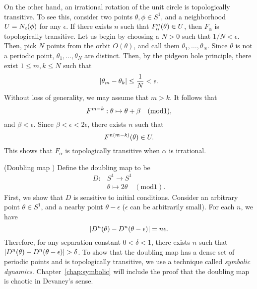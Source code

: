 \documentclass[10pt,draft,twoside]{book}
\begin{document}
\begin{example}
On the other hand, an irrational rotation of the unit circle is topologically transitive.
To see this, consider two points $\theta, \phi \in S^1$, and a neighborhood $U = N_{\epsilon}(\phi)$ for any $\epsilon$.
If there exists $n$ such that $F_\alpha^{n}(\theta) \in U$, then $F_\alpha$ is topologically transitive.
Let us begin by choosing a $N > 0$ such that $1/N < \epsilon$.
Then, pick $N$ points from the orbit $O(\theta)$, and call them $\theta_1, \ldots, \theta_N$.
Since $\theta$ is not a periodic point, $\theta_1, \ldots, \theta_N$ are distinct.
Then, by the pidgeon hole principle, there exist $1 \leq m,k \leq N$ such that
\begin{equation*}
  \left |  \theta_m - \theta_k  \right | \leq \frac{1}{N} < \epsilon.
\end{equation*}
Without loss of generality, we may assume that $m > k$.
It follows that 
\begin{equation*}
  F^{m - k}: \theta \mapsto \theta + \beta \quad(\mathrm{mod} 1),
\end{equation*}
and $\beta < \epsilon$.
Since $\beta < \epsilon < 2\epsilon$, there exists $n$ such that
\begin{equation*}
  F^{n(m-k)}(\theta) \in U.
\end{equation*}
This shows that $F_\alpha$ is topologically transitive when $\alpha$ is irrational.
\end{example}
\begin{example}
  (Doubling map \citep{devaney})
  Define the doubling map to be 
  \begin{align*}
    D: &S^1 \to S^1  \\
    &\theta \mapsto 2\theta \quad(\mathrm{mod} 1).
  \end{align*}
  First, we show that $D$ is sensitive to initial conditions. 
  Consider an arbitrary point $\theta \in S^1$, and a nearby point $\theta - \epsilon$ ($\epsilon$ can be arbitrarily small).
  For each $n$, we have
  \begin{equation*}
    \left |  D^{n}(\theta) - D^{n}(\theta - \epsilon)  \right | 
    = 
    n\epsilon.
  \end{equation*}
  Therefore, for any separation constant $0 < \delta < 1$, there exists $n$ such that $\left |  D^{n}(\theta) - D^{n}(\theta - \epsilon)  \right | > \delta$.
  To show that the doubling map has a dense set of periodic points and is topologically transitive, we use a technique called \textit{symbolic dynamics}.
  Chapter~\ref{chap:symbolic} will include the proof that the doubling map is chaotic in Devaney's sense.
\end{example}
\end{document}
